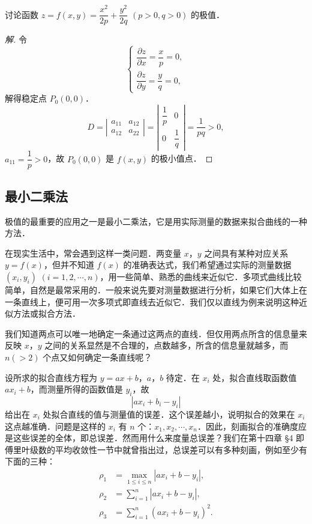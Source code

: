 \begin{example}\label{ex:18-1-1}
讨论函数 $z=f(x,y)=\dfrac{x^{2}}{2p}+\dfrac{y^{2}}{2q}$ $(p>0,q>0)$ 的极值．
\end{example}

\begin{proof}[解]
令
\[
\begin{cases}
\dfrac{\partial z}{\partial x}=\dfrac{x}{p}=0,\\[2mm]
\dfrac{\partial z}{\partial y}=\dfrac{y}{q}=0,
\end{cases}
\]
解得稳定点 $P_{0}(0,0)$．
\[
D=\left|\begin{array}{cc}a_{11}&a_{12}\\ a_{12}&a_{22}\end{array}\right|=\left|\begin{array}{cc}\dfrac{1}{p}&0\\[2mm] 0&\dfrac{1}{q}\end{array}\right|=\frac{1}{pq}>0,
\]
$a_{11}=\dfrac{1}{p}>0$，故 $P_{0}(0,0)$ 是 $f(x,y)$ 的极小值点．
\end{proof}

\subsection{最小二乘法}

极值的最重要的应用之一是最小二乘法，它是用实际测量的数据来拟合曲线的一种方法．

在现实生活中，常会遇到这样一类问题．两变量 $x$，$y$ 之间具有某种对应关系 $y=f(x)$，但并不知道 $f(x)$ 的准确表达式，我们希望通过实际的测量数据 $(x_{i},y_{i})$ $(i=1,2,\cdots,n)$，用一些简单、熟悉的曲线来近似它．多项式曲线比较简单，自然是最常采用的．一般来说先要对测量数据进行分析，如果它们大体上在一条直线上，便可用一次多项式即直线去近似它．我们仅以直线为例来说明这种近似方法或拟合方法．

我们知道两点可以唯一地确定一条通过这两点的直线．但仅用两点所含的信息量来反映 $x$，$y$ 之间的关系显然是不合理的，点数越多，所含的信息量就越多，而 $n(>2)$ 个点又如何确定一条直线呢？

设所求的拟合直线方程为 $y=ax+b$，$a$，$b$ 待定．在 $x_{i}$ 处，拟合直线取函数值 $ax_{i}+b$，而测量所得的函数值是 $y_{i}$，故
\[
\left|ax_{i}+b_{i}-y_{i}\right|
\]
给出在 $x_{i}$ 处拟合直线的值与测量值的误差．这个误差越小，说明拟合的效果在 $x_{i}$ 这点越准确．问题是这样的 $x_{i}$ 有 $n$ 个：$x_{1},x_{2},\cdots,x_{n}$．因此，刻画拟合的准确度应是这些误差的全体，即总误差．然而用什么来度量总误差？我们在第十四章 §4 即傅里叶级数的平均收敛性一节中就曾指出过，总误差可以有多种刻画，例如至少有下面的三种：
\[
\begin{aligned}
\rho_{1}&=\max_{1\leqslant i\leqslant n}\left|ax_{i}+b-y_{i}\right|,\\
\rho_{2}&=\sum_{i=1}^{n}\left|ax_{i}+b-y_{i}\right|,\\
\rho_{3}&=\sum_{i=1}^{n}\left(ax_{i}+b-y_{i}\right)^{2}.
\end{aligned}
\]

